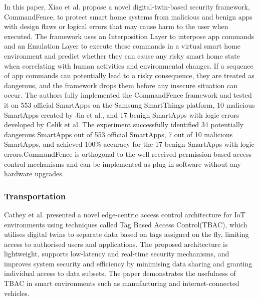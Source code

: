 In\cite{xiaoCommandFenceNovelDigitalTwinBased2022} this paper,  Xiao et al. propose a novel digital-twin-based security framework, CommandFence, to protect smart home systems from malicious and benign apps with design flaws or logical errors that may cause harm to the user when executed. The framework uses an Interposition Layer to interpose app commands and an Emulation Layer to execute these commands in a virtual smart home environment and predict whether they can cause any risky smart home state when correlating with human activities and environmental changes. If a sequence of app commands can potentially lead to a risky consequence, they are treated as dangerous, and the framework drops them before any insecure situation can occur. The authors fully implemented the CommandFence framework and tested it on 553 official SmartApps on the Samsung SmartThings platform, 10 malicious SmartApps created by Jia et al., and 17 benign SmartApps with logic errors developed by Celik et al. The experiment successfully identified 34 potentially dangerous SmartApps out of 553 official SmartApps, 7 out of 10 malicious SmartApps, and achieved 100\% accuracy for the 17 benign SmartApps with logic errors.CommandFence is orthogonal to the well-received permission-based access control mechanisms and can be implemented as plug-in software without any hardware upgrades. 

\subsubsection{Transportation}

Cathey et al.\cite{glenandbensonjamesandguptamaanakandsandhuravicatheyEdgeCentricSecure2021} presented a novel edge-centric access control architecture for IoT environments using techniques called Tag Based Access Control(TBAC), which utilises digital twins to separate data based on tags assigned on the fly, limiting access to authorised users and applications. The proposed architecture is lightweight, supports low-latency and real-time security mechanisms, and improves system security and efficiency by minimising data sharing and granting individual access to data subsets. The paper demonstrates the usefulness of TBAC in smart environments such as manufacturing and internet-connected vehicles.

